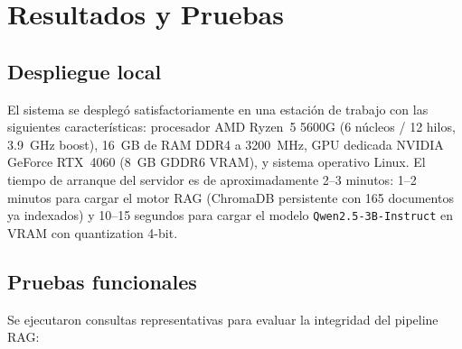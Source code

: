 \section{Resultados y Pruebas}
\label{sec:resultados}

\subsection{Despliegue local}

El sistema se desplegó satisfactoriamente en una estación de trabajo con las siguientes características: procesador AMD Ryzen~5 5600G (6 núcleos / 12 hilos, 3.9~GHz boost), 16~GB de RAM DDR4 a 3200~MHz, GPU dedicada NVIDIA GeForce RTX~4060 (8~GB GDDR6 VRAM), y sistema operativo Linux. El tiempo de arranque del servidor es de aproximadamente 2--3 minutos: 1--2 minutos para cargar el motor RAG (ChromaDB persistente con 165 documentos ya indexados) y 10--15 segundos para cargar el modelo \texttt{Qwen2.5-3B-Instruct} en VRAM con quantization 4-bit.

\subsection{Pruebas funcionales}

Se ejecutaron consultas representativas para evaluar la integridad del pipeline RAG:

